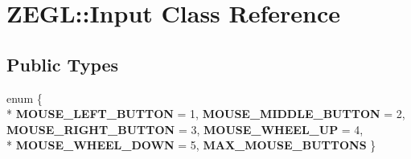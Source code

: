 \hypertarget{class_z_e_g_l_1_1_input}{}\section{Z\+E\+G\+L\+:\+:Input Class Reference}
\label{class_z_e_g_l_1_1_input}
\subsection*{Public Types}
\begin{DoxyCompactItemize}
\item 
\hypertarget{class_z_e_g_l_1_1_input_aa767ce6639ffad5eb032a94b3c423b9a}{}enum \{ \\*
{\bfseries M\+O\+U\+S\+E\+\_\+\+L\+E\+F\+T\+\_\+\+B\+U\+T\+T\+O\+N} = 1, 
{\bfseries M\+O\+U\+S\+E\+\_\+\+M\+I\+D\+D\+L\+E\+\_\+\+B\+U\+T\+T\+O\+N} = 2, 
{\bfseries M\+O\+U\+S\+E\+\_\+\+R\+I\+G\+H\+T\+\_\+\+B\+U\+T\+T\+O\+N} = 3, 
{\bfseries M\+O\+U\+S\+E\+\_\+\+W\+H\+E\+E\+L\+\_\+\+U\+P} = 4, 
\\*
{\bfseries M\+O\+U\+S\+E\+\_\+\+W\+H\+E\+E\+L\+\_\+\+D\+O\+W\+N} = 5, 
{\bfseries M\+A\+X\+\_\+\+M\+O\+U\+S\+E\+\_\+\+B\+U\+T\+T\+O\+N\+S}
 \}\label{class_z_e_g_l_1_1_input_aa767ce6639ffad5eb032a94b3c423b9a}


\end{DoxyCompactItemize}
